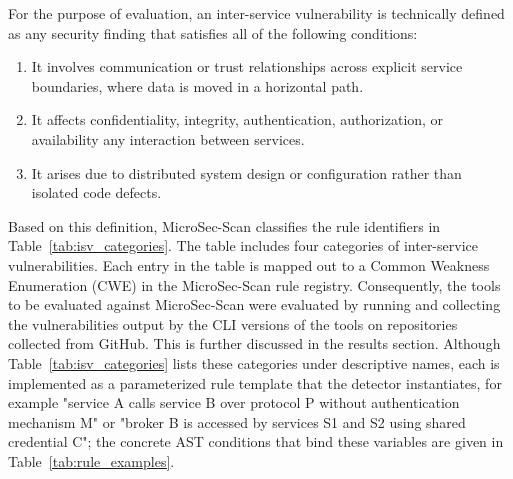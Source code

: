 \documentclass[preprint,12pt]{elsarticle}
\newcommand{\new}[1]{#1}
\begin{document}
For the purpose of evaluation, an inter-service vulnerability is technically defined as any security finding that satisfies all of the following conditions:
\begin{enumerate}
    \item It involves communication or trust relationships across explicit service boundaries, where data is moved in a horizontal path.
    \item It affects confidentiality, integrity, authentication, authorization, or availability any interaction between services.
    \item It arises due to distributed system design or configuration rather than isolated code defects.
\end{enumerate}

Based on this definition, MicroSec-Scan classifies the rule identifiers in Table~\ref{tab:isv_categories}. The table includes four categories of inter-service vulnerabilities. Each entry in the table is mapped out to a Common Weakness Enumeration (CWE) in the MicroSec-Scan rule registry. Consequently, the tools to be evaluated against MicroSec-Scan were evaluated by running and collecting the vulnerabilities output by the CLI versions of the tools on repositories collected from GitHub. This is further discussed in the results section. \new{Although Table~\ref{tab:isv_categories} lists these categories under descriptive names, each is implemented as a parameterized rule template that the detector instantiates, for example "service A calls service B over protocol P without authentication mechanism M" or "broker B is accessed by services S1 and S2 using shared credential C"; the concrete AST conditions that bind these variables are given in Table~\ref{tab:rule_examples}.} 
\end{document}
